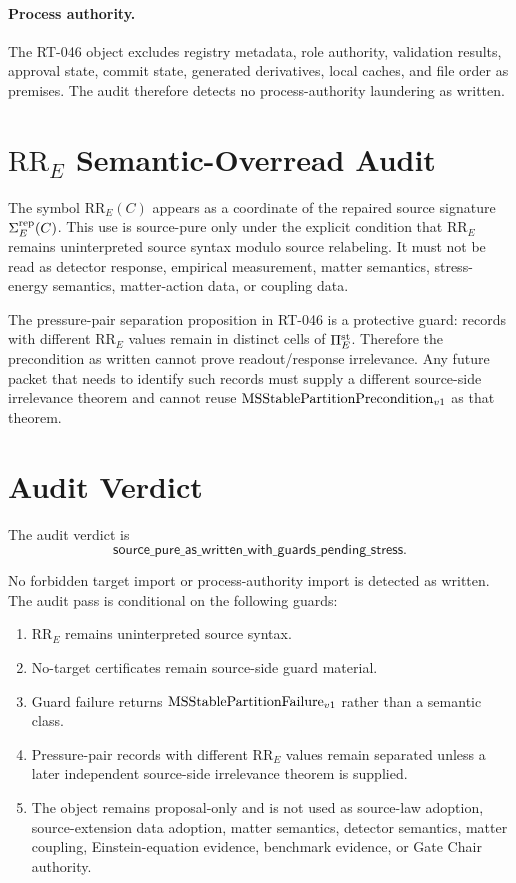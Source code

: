\paragraph{Process authority.}
The RT-046 object excludes registry metadata, role authority, validation
results, approval state, commit state, generated derivatives, local caches,
and file order as premises. The audit therefore detects no process-authority
laundering as written.

\section{\(\mathrm{RR}_E\) Semantic-Overread Audit}

The symbol \(\mathrm{RR}_E(C)\) appears as a coordinate of the repaired source
signature \(\Sigma^{\mathrm{rep}}_E(C)\). This use is source-pure only under the explicit
condition that \(\mathrm{RR}_E\) remains uninterpreted source syntax modulo
source relabeling. It must not be read as detector response, empirical
measurement, matter semantics, stress-energy semantics, matter-action data,
or coupling data.

The pressure-pair separation proposition in RT-046 is a protective guard:
records with different \(\mathrm{RR}_E\) values remain in distinct cells of
\(\Pi^{\mathrm{st}}_E\). Therefore the precondition as written cannot prove
readout/response irrelevance. Any future packet that needs to identify such
records must supply a different source-side irrelevance theorem and cannot
reuse \(\mathrm{MSStablePartitionPrecondition}_{v1}\) as that theorem.

\section{Audit Verdict}

The audit verdict is
\[
  \mathsf{source\_pure\_as\_written\_with\_guards\_pending\_stress}.
\]

No forbidden target import or process-authority import is detected as written.
The audit pass is conditional on the following guards:
\begin{enumerate}
  \item \(\mathrm{RR}_E\) remains uninterpreted source syntax.
  \item No-target certificates remain source-side guard material.
  \item Guard failure returns \(\mathrm{MSStablePartitionFailure}_{v1}\) rather than a semantic class.
  \item Pressure-pair records with different \(\mathrm{RR}_E\) values remain
    separated unless a later independent source-side irrelevance theorem is
    supplied.
  \item The object remains proposal-only and is not used as source-law
    adoption, source-extension data adoption, matter semantics, detector
    semantics, matter coupling, Einstein-equation evidence, benchmark
    evidence, or Gate Chair authority.
\end{enumerate}

